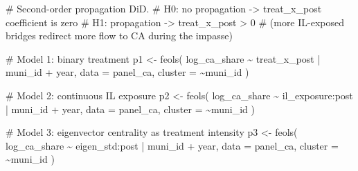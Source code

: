 \documentclass[
  11pt,
  letterpaper,
  DIV=11,
  numbers=noendperiod]{scrartcl}
\newenvironment{Shaded}{}{}
\newcommand{\AttributeTok}[1]{\textcolor[rgb]{0.84,0.23,0.29}{#1}}
\newcommand{\CommentTok}[1]{\textcolor[rgb]{0.42,0.45,0.49}{#1}}
\newcommand{\FunctionTok}[1]{\textcolor[rgb]{0.44,0.26,0.76}{#1}}
\newcommand{\NormalTok}[1]{\textcolor[rgb]{0.14,0.16,0.18}{#1}}
\newcommand{\OtherTok}[1]{\textcolor[rgb]{0.44,0.26,0.76}{#1}}
\newcommand{\SpecialCharTok}[1]{\textcolor[rgb]{0.00,0.36,0.77}{#1}}
\begin{document}
\begin{Shaded}
\begin{Highlighting}[]
\CommentTok{\# Second{-}order propagation DiD.}
\CommentTok{\# H0: no propagation {-}\textgreater{} treat\_x\_post coefficient is zero}
\CommentTok{\# H1: propagation    {-}\textgreater{} treat\_x\_post \textgreater{} 0}
\CommentTok{\#   (more IL{-}exposed bridges redirect more flow to CA during the impasse)}

\CommentTok{\# Model 1: binary treatment}
\NormalTok{p1 }\OtherTok{\textless{}{-}} \FunctionTok{feols}\NormalTok{(}
\NormalTok{  log\_ca\_share }\SpecialCharTok{\textasciitilde{}}\NormalTok{ treat\_x\_post }\SpecialCharTok{|}\NormalTok{ muni\_id }\SpecialCharTok{+}\NormalTok{ year,}
  \AttributeTok{data    =}\NormalTok{ panel\_ca,}
  \AttributeTok{cluster =} \SpecialCharTok{\textasciitilde{}}\NormalTok{muni\_id}
\NormalTok{)}

\CommentTok{\# Model 2: continuous IL exposure}
\NormalTok{p2 }\OtherTok{\textless{}{-}} \FunctionTok{feols}\NormalTok{(}
\NormalTok{  log\_ca\_share }\SpecialCharTok{\textasciitilde{}}\NormalTok{ il\_exposure}\SpecialCharTok{:}\NormalTok{post }\SpecialCharTok{|}\NormalTok{ muni\_id }\SpecialCharTok{+}\NormalTok{ year,}
  \AttributeTok{data    =}\NormalTok{ panel\_ca,}
  \AttributeTok{cluster =} \SpecialCharTok{\textasciitilde{}}\NormalTok{muni\_id}
\NormalTok{)}

\CommentTok{\# Model 3: eigenvector centrality as treatment intensity}
\NormalTok{p3 }\OtherTok{\textless{}{-}} \FunctionTok{feols}\NormalTok{(}
\NormalTok{  log\_ca\_share }\SpecialCharTok{\textasciitilde{}}\NormalTok{ eigen\_std}\SpecialCharTok{:}\NormalTok{post }\SpecialCharTok{|}\NormalTok{ muni\_id }\SpecialCharTok{+}\NormalTok{ year,}
  \AttributeTok{data    =}\NormalTok{ panel\_ca,}
  \AttributeTok{cluster =} \SpecialCharTok{\textasciitilde{}}\NormalTok{muni\_id}
\NormalTok{)}


\end{Highlighting}
\end{Shaded}
\end{document}
